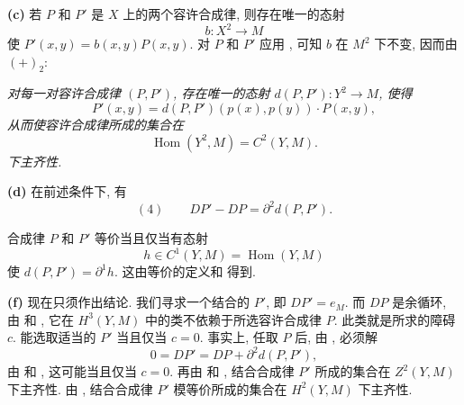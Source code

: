 \smallskip
\noindent\textbf{(c)}
若 \(P\) 和 \(P'\) 是 \(X\) 上的两个容许合成律,
则存在唯一的态射
\[
 b:X^2\longrightarrow M
\]
使 \(P'(x,y)=b(x,y)P(x,y)\).
对 \(P\) 和 \(P'\) 应用 ,
可知 \(b\) 在 \(M^2\) 下不变, 因而由 \((+)_{2}\):

\smallskip
\noindent\textit{
对每一对容许合成律 \((P,P')\), 存在唯一的态射
\(d(P,P'):Y^2\to M\), 使得}
\[
 P'(x,y)=d(P,P')(p(x),p(y))\cdot P(x,y),
\]
\textit{从而使容许合成律所成的集合在}
\[
 \operatorname{Hom}(Y^2,M)=C^2(Y,M).
\]
\textit{下主齐性.}

\smallskip
\noindent\textbf{(d)}
在前述条件下, 有
\[
 (4)\qquad DP'-DP=\partial^2d(P,P').
\]

\smallskip
\noindent\textbf{}
合成律 \(P\) 和 \(P'\) 等价当且仅当有态射
\[
 h\in C^1(Y,M)=\operatorname{Hom}(Y,M)
\]
使 \(d(P,P')=\partial^1h\). 这由等价的定义和
 得到.

\smallskip
\noindent\textbf{(f)}
现在只须作出结论. 我们寻求一个结合的 \(P'\), 即
\(DP'=e_M\). 而 \(DP\) 是余循环, 由
 和 ,
它在 \(H^3(Y,M)\) 中的类不依赖于所选容许合成律 \(P\).
此类就是所求的障碍 \(c\). 能选取适当的 \(P'\) 当且仅当 \(c=0\).
事实上, 任取 \(P\) 后, 由 , 必须解
\[
 0=DP'=DP+\partial^2d(P,P'),
\]
由  和 ,
这可能当且仅当 \(c=0\). 再由  和
, 结合合成律 \(P'\)
所成的集合在 \(Z^2(Y,M)\) 下主齐性.
由 ,
结合合成律 \(P'\) 模等价所成的集合在 \(H^2(Y,M)\) 下主齐性.


